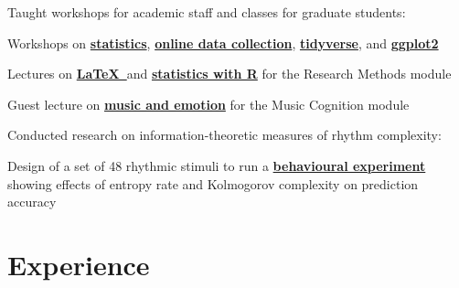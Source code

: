 \documentclass[]{deedy-resume-openfont}
\begin{document}
\begin{minipage}[t]{0.66\textwidth}
Taught workshops for academic staff and classes for graduate students:
\begin{tightemize}
\item Workshops on \textbf{\href{https://github.com/remidefleurian/teaching/tree/master/lectures/intro-to-stats}{statistics}}, \textbf{\href{https://github.com/remidefleurian/teaching/tree/master/lectures/online-data-collection}{online data collection}}, \textbf{\href{https://github.com/remidefleurian/teaching/tree/master/lectures/intro-to-tidyverse}{tidyverse}}, and \textbf{\href{https://github.com/remidefleurian/teaching/tree/master/lectures/intro-to-ggplot2}{ggplot2}}
\item Lectures on \textbf{\href{https://github.com/remidefleurian/teaching/tree/master/lectures/typesetting-with-latex}{\LaTeX\ }}and \textbf{\href{https://github.com/remidefleurian/teaching/tree/master/lectures/stats-with-r}{statistics with R}} for the Research Methods module 
\item Guest lecture on \textbf{\href{https://github.com/remidefleurian/teaching/tree/master/lectures/music-and-emotion}{music and emotion}} for the Music Cognition module
\end{tightemize}
\sectionsep

Conducted research on information-theoretic measures of rhythm complexity: 
\begin{tightemize}
\item Design of a set of 48 rhythmic stimuli to run a  \href{https://doi.org/10.1111/cogs.12347}{\bf behavioural experiment} showing effects of entropy rate and Kolmogorov complexity on prediction accuracy
\end{tightemize}
\sectionsep

\sectionsep

\section{Experience}


\end{minipage}
\end{document}
